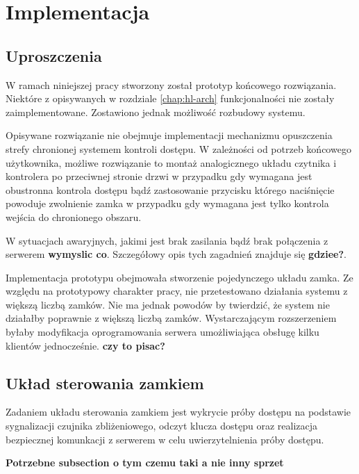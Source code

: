 \chapter{Implementacja}

\section{Uproszczenia}

    W ramach niniejszej pracy stworzony został prototyp końcowego rozwiązania. Niektóre z opisywanych w rozdziale \ref{chap:hl-arch} funkcjonalności nie zostały zaimplementowane. Zostawiono jednak możliwość rozbudowy systemu.

    Opisywane rozwiązanie nie obejmuje implementacji mechanizmu opuszczenia strefy chronionej systemem kontroli dostępu. W zależności od potrzeb końcowego użytkownika, możliwe rozwiązanie to montaż analogicznego układu czytnika i kontrolera po przeciwnej stronie drzwi w przypadku gdy wymagana jest obustronna kontrola dostępu bądź zastosowanie przycisku którego naciśnięcie powoduje zwolnienie zamka w przypadku gdy wymagana jest tylko kontrola wejścia do chronionego obszaru.

    W sytuacjach awaryjnych, jakimi jest brak zasilania bądź brak połączenia z serwerem \textbf{wymyslic co}. Szczegółowy opis tych zagadnień znajduje się \textbf{gdziee?}.

    Implementacja prototypu obejmowała stworzenie pojedynczego układu zamka. Ze względu na prototypowy charakter pracy, nie przetestowano działania systemu z większą liczbą zamków. Nie ma jednak powodów by twierdzić, że system nie działałby poprawnie z większą liczbą zamków. Wystarczającym rozszerzeniem byłaby modyfikacja oprogramowania serwera umożliwiająca obsługę kilku klientów jednocześnie. \textbf{czy to pisac?}

\section{Układ sterowania zamkiem}

    Zadaniem układu sterowania zamkiem jest wykrycie próby dostępu na podstawie sygnalizacji czujnika zbliżeniowego, odczyt klucza dostępu oraz realizacja bezpiecznej komunkacji z serwerem w celu uwierzytelnienia próby dostępu.

    \textbf{Potrzebne subsection o tym czemu taki a nie inny sprzet}
